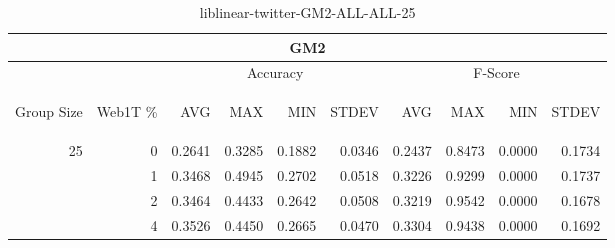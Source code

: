 \begin{center}
\begin{table}[htbp] 
 \begin{center}
\begin{tabular}{ | r | r | r | r | r | r | r | r | r | r |}
\hline
\multicolumn{10}{|c|}{GM2}\\
\hline
 & & \multicolumn{4}{|c|}{Accuracy} & \multicolumn{4}{|c|}{F-Score}\\ \cline{3-10}
\begin{sideways}Group Size\end{sideways} & \begin{sideways}Web1T \%\end{sideways} & \begin{sideways}AVG\end{sideways} & \begin{sideways}MAX\end{sideways} & \begin{sideways}MIN\end{sideways} & \begin{sideways}STDEV\end{sideways} & \begin{sideways}AVG\end{sideways} & \begin{sideways}MAX\end{sideways} & \begin{sideways}MIN\end{sideways} & \begin{sideways}STDEV\end{sideways}\\
\hline
\multirow{3}{*}{25}
 & 0 & 0.2641 & 0.3285 & 0.1882 & 0.0346 & 0.2437 & 0.8473 & 0.0000 & 0.1734\\ \cline{2-10}
 & 1 & 0.3468 & 0.4945 & 0.2702 & 0.0518 & 0.3226 & 0.9299 & 0.0000 & 0.1737\\ \cline{2-10}
 & 2 & 0.3464 & 0.4433 & 0.2642 & 0.0508 & 0.3219 & 0.9542 & 0.0000 & 0.1678\\ \cline{2-10}
 & 4 & 0.3526 & 0.4450 & 0.2665 & 0.0470 & 0.3304 & 0.9438 & 0.0000 & 0.1692\\ \cline{2-10}
\hline
\end{tabular}
\caption{liblinear-twitter-GM2-ALL-ALL-25}
\label{table:liblinear-twitter-GM2-ALL-ALL-25}
\end{center}
 \end{table}
\end{center}

